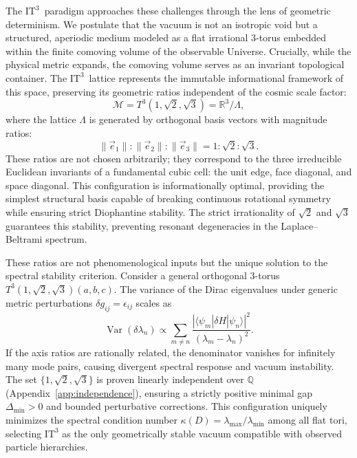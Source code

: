 \documentclass[onecolumn,aps,prd,superscriptaddress,nofootinbib,amsmath,amssymb]{revtex4-2}
\theoremstyle{definition}
\theoremstyle{remark}
\newcommand{\ITthree}{\ensuremath{\mathrm{IT}^3}}
\newcommand{\Tthree}{T^3(1,\sqrt{2},\sqrt{3})}
\begin{document}
The \ITthree\ paradigm approaches these challenges through the lens of geometric determinism. We postulate that the vacuum is not an isotropic void but a structured, aperiodic medium modeled as a flat irrational 3-torus embedded within the finite comoving volume of the observable Universe. Crucially, while the physical metric expands, the comoving volume serves as an invariant topological container. The \ITthree\ lattice represents the immutable informational framework of this space, preserving its geometric ratios independent of the cosmic scale factor:
\begin{equation}
\mathcal{M} = \Tthree = \mathbb{R}^3 / \Lambda,
\end{equation}
where the lattice $\Lambda$ is generated by orthogonal basis vectors with magnitude ratios:
\begin{equation}
\|\vec{e}_1\| : \|\vec{e}_2\| : \|\vec{e}_3\| = 1 : \sqrt{2} : \sqrt{3}.
\label{eq:fundamental_metric}
\end{equation}
These ratios are not chosen arbitrarily; they correspond to the three irreducible Euclidean invariants of a fundamental cubic cell: the unit edge, face diagonal, and space diagonal. This configuration is informationally optimal, providing the simplest structural basis capable of breaking continuous rotational symmetry while ensuring strict Diophantine stability. The strict irrationality of $\sqrt{2}$ and $\sqrt{3}$ guarantees this stability, preventing resonant degeneracies in the Laplace--Beltrami spectrum.

These ratios are not phenomenological inputs but the unique solution to the spectral stability criterion. Consider a general orthogonal 3-torus $\Tthree(a,b,c)$. The variance of the Dirac eigenvalues under generic metric perturbations $\delta g_{ij} = \epsilon_{ij}$ scales as
\begin{equation}
\operatorname{Var}(\delta \lambda_n) \propto \sum_{m \neq n} \frac{|\langle \psi_m | \delta H | \psi_n \rangle|^2}{(\lambda_m - \lambda_n)^2}.
\end{equation}
If the axis ratios are rationally related, the denominator vanishes for infinitely many mode pairs, causing divergent spectral response and vacuum instability. The set $\{1, \sqrt{2}, \sqrt{3}\}$ is proven linearly independent over $\mathbb{Q}$ (Appendix~\ref{app:independence}), ensuring a strictly positive minimal gap $\Delta_{\min} > 0$ and bounded perturbative corrections. This configuration uniquely minimizes the spectral condition number $\kappa(D) = \lambda_{\max}/\lambda_{\min}$ among all flat tori, selecting $\ITthree$ as the only geometrically stable vacuum compatible with observed particle hierarchies.
\end{document}
